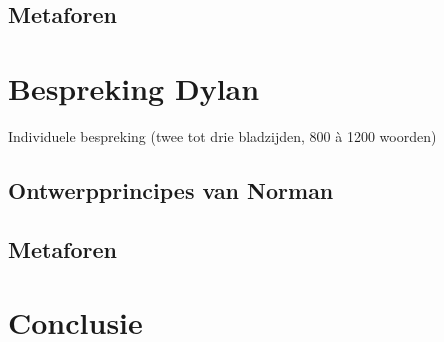 \documentclass[11pt]{article}
\begin{document}
\subsection{Metaforen}
\newpage

\section{Bespreking Dylan}
Individuele bespreking (twee tot drie bladzijden, 800 à 1200 woorden)
\subsection{Ontwerpprincipes van Norman}
\subsection{Metaforen}
\newpage


\section{Conclusie}

\newpage
\end{document}
